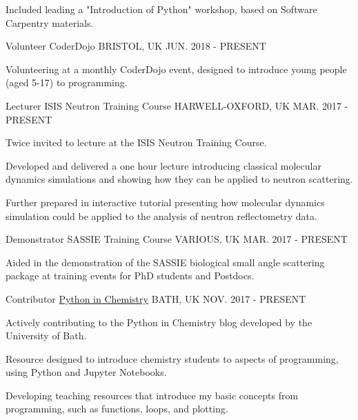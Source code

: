 \begin{cventries}
{\begin{cvitems}
			\item {Included leading a "Introduction of Python" workshop, based on Software Carpentry materials. }
		\end{cvitems}
	}
	\cventry
	{Volunteer}
	{CoderDojo}
	{BRISTOL, UK}
	{JUN. 2018 - PRESENT}
	{
	    \begin{cvitems}
	        \item {Volunteering at a monthly CoderDojo event, designed to introduce young people (aged 5-17) to programming.}
	    \end{cvitems}
	}
	\cventry
	{Lecturer}
	{ISIS Neutron Training Course}
	{HARWELL-OXFORD, UK}
	{MAR. 2017 - PRESENT}
	{
		\begin{cvitems}
			\item {Twice invited to lecture at the ISIS Neutron Training Course.}
			\item {Developed and delivered a one hour lecture introducing classical molecular dynamics simulations and showing how they can be applied to neutron scattering.}
			\item {Further prepared in interactive tutorial presenting how molecular dynamics simulation could be applied to the analysis of neutron reflectometry data.}
		\end{cvitems}
	}
	\cventry
	{Demonstrator}
	{SASSIE Training Course}
	{VARIOUS, UK}
	{MAR. 2017 - PRESENT}
	{
		\begin{cvitems}
			\item {Aided in the demonstration of the SASSIE biological small angle scattering package at training events for PhD students and Postdocs.}
		\end{cvitems}
	}
	\cventry
	{Contributor}
	{\href{http://blogs.bath.ac.uk/python/}{Python in Chemistry}}
	{BATH, UK}
	{NOV. 2017 - PRESENT}
	{
		\begin{cvitems}
			\item {Actively contributing to the Python in Chemistry blog developed by the University of Bath.}
			\item {Resource designed to introduce chemistry students to aspects of programming, using Python and Jupyter Notebooks.}
			\item {Developing teaching resources that introduce my basic concepts from programming, such as functions, loops, and plotting.}
		\end{cvitems}
	}
\end{cventries}
